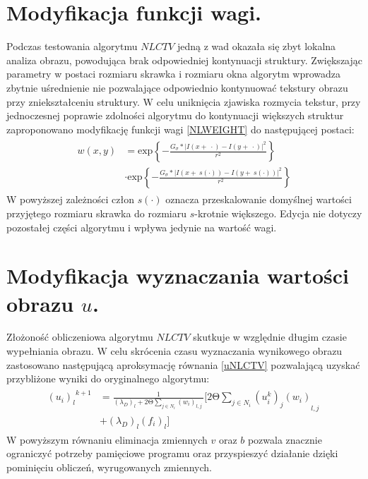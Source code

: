 \documentclass[12pt, twoside, openany]{report}
\theoremstyle{definition}
\begin{document}
\section{Modyfikacja funkcji wagi.}
Podczas testowania algorytmu $NLCTV$ jedną z wad okazała się zbyt lokalna analiza obrazu, powodująca brak odpowiedniej kontynuacji struktury. Zwiększając parametry w postaci rozmiaru skrawka i rozmiaru okna algorytm wprowadza zbytnie uśrednienie nie pozwalające odpowiednio kontynuować tekstury obrazu przy zniekształceniu struktury. W celu uniknięcia zjawiska rozmycia tekstur, przy jednoczesnej poprawie zdolności algorytmu do kontynuacji większych struktur zaproponowano modyfikację funkcji wagi \eqref{NLWEIGHT} do następującej postaci:
\begin{align}
\begin{aligned}
w\left(x,y\right) &= {\mathrm{exp} \left\{-\frac{G_{\sigma }*{\left|I\left(x+\ \cdot \right)-I\left(y+\ \cdot \right)\right|}^2}{r^2}\right\} }\\
&\cdot {\mathrm{exp} \left\{-\frac{G_{\sigma }*{\left|I\left(x+\ s(\cdot) \right)-I\left(y+\ s(\cdot) \right)\right|}^2}{r^2}\right\} }
\label{NLWEIGHTMODIFIED}
\end{aligned}
\end{align}
W powyższej zależności człon $s(\cdot)$ oznacza przeskalowanie  domyślnej wartości przyjętego rozmiaru skrawka do rozmiaru $s$-krotnie większego. Edycja nie dotyczy pozostałej części  algorytmu i wpływa jedynie na wartość wagi.
\section{Modyfikacja wyznaczania wartości obrazu $u$.}
Złożoność obliczeniowa algorytmu $NLCTV$ skutkuje w względnie długim czasie wypełniania obrazu. W celu skrócenia czasu wyznaczania wynikowego obrazu zastosowano następującą aproksymację równania  \eqref{uNLCTV} pozwalającą uzyskać przybliżone wyniki do oryginalnego algorytmu:
\begin{align}
\begin{aligned}
{{\left(u_i\right)}_l}^{k+1} &= \frac{1}{{\left({\lambda }_D\right)}_l+2\mathrm{\Theta} \sum\limits_{j\in N_i} {\left(w_i\right)}_{l,j}\ } \Biggl[2\mathrm{\Theta }\sum_{j\in N_i} {{{\left(u^k_i\right)}_j\left(w_i\right)}_{l,j}\ }\\
&+ {\left({\lambda }_D\right)}_l{\left(f_i\right)}_l\Biggr]
\end{aligned}
\end{align}
W powyższym równaniu eliminacja zmiennych $v$ oraz $b$ pozwala znacznie ograniczyć potrzeby pamięciowe programu oraz przyspieszyć działanie dzięki pominięciu obliczeń, wyrugowanych zmiennych.
\end{document}
